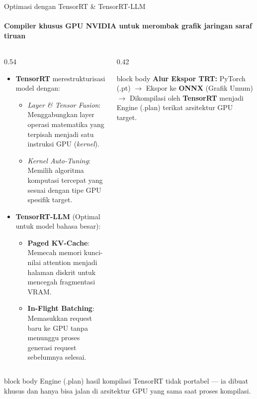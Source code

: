 \documentclass[aspectratio=169,t]{beamer}
\newcommand{\takeaway}[1]{%
  \vspace{0.1em}
  \begin{beamercolorbox}[rounded=true,shadow=false,sep=5pt]{block body}
    \centering\footnotesize\color{nvlightgreen}#1
  \end{beamercolorbox}%
}
\begin{document}
\begin{frame}{Optimasi dengan TensorRT \& TensorRT-LLM}
  \framesubtitle{Compiler khusus GPU NVIDIA untuk merombak grafik jaringan saraf tiruan}
  \begin{columns}[T]
    \begin{column}{0.54\textwidth}
      \begin{itemize}\footnotesize
        \item \textbf{TensorRT} merestrukturisasi model dengan:
          \begin{itemize}\scriptsize
            \item \emph{Layer \& Tensor Fusion}: Menggabungkan layer operasi matematika yang terpisah menjadi satu instruksi GPU (\emph{kernel}).
            \item \emph{Kernel Auto-Tuning}: Memilih algoritma komputasi tercepat yang sesuai dengan tipe GPU spesifik target.
          \end{itemize}
        \item \textbf{TensorRT-LLM} (Optimal untuk model bahasa besar):
          \begin{itemize}\scriptsize
            \item \textbf{Paged KV-Cache}: Memecah memori kunci-nilai attention menjadi halaman diskrit untuk mencegah fragmentasi VRAM.
            \item \textbf{In-Flight Batching}: Memasukkan request baru ke GPU tanpa menunggu proses generasi request sebelumnya selesai.
          \end{itemize}
      \end{itemize}
    \end{column}
    \begin{column}{0.42\textwidth}
      \begin{center}
      \begin{beamercolorbox}[rounded=true,shadow=false,sep=8pt]{block body}
        {\footnotesize\color{nvlightgreen}\textbf{Alur Ekspor TRT:}}
        \vspace{0.3em}
        {\scriptsize\color{nvwhite}
        PyTorch (.pt) $\to$ Ekspor ke \textbf{ONNX} (Grafik Umum) $\to$ Dikompilasi oleh \textbf{TensorRT} menjadi Engine (.plan) terikat arsitektur GPU target.}
      \end{beamercolorbox}
      \end{center}
    \end{column}
  \end{columns}
  \takeaway{Engine (.plan) hasil kompilasi TensorRT tidak portabel --- ia dibuat khusus dan hanya bisa jalan di arsitektur GPU yang sama saat proses kompilasi.}
\end{frame}
\end{document}
